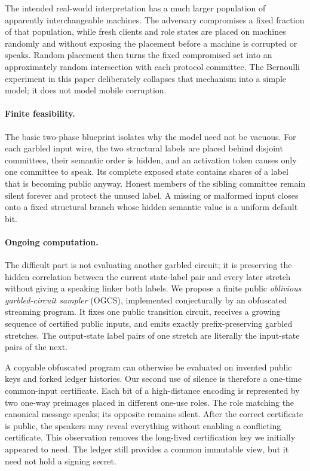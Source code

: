 The intended real-world interpretation has a much larger population of
apparently interchangeable machines. The adversary compromises a fixed
fraction of that population, while fresh clients and role states are placed
on machines randomly and without exposing the placement before a machine is
corrupted or speaks. Random placement then turns the fixed compromised set
into an approximately random intersection with each protocol committee. The
Bernoulli experiment in this paper deliberately collapses that mechanism into
a simple model; it does not model mobile corruption.

\paragraph{Finite feasibility.}
The basic two-phase blueprint isolates why the model need not be vacuous. For
each garbled input wire, the two structural labels are placed behind disjoint
committees, their semantic order is hidden, and an activation token causes
only one committee to speak. Its complete exposed state contains shares of a
label that is becoming public anyway. Honest members of the sibling committee
remain silent forever and protect the unused label. A missing or malformed
input closes onto a fixed structural branch whose hidden semantic value is a
uniform default bit.

\paragraph{Ongoing computation.}
The difficult part is not evaluating another garbled circuit; it is preserving
the hidden correlation between the current state-label pair and every later
stretch without giving a speaking linker both labels. We propose a finite
public \emph{oblivious garbled-circuit sampler} (OGCS), implemented
conjecturally by an obfuscated streaming program. It fixes one public
transition circuit, receives a growing sequence of certified public inputs,
and emits exactly prefix-preserving garbled stretches. The output-state label
pairs of one stretch are literally the input-state pairs of the next.

A copyable obfuscated program can otherwise be evaluated on invented public
keys and forked ledger histories. Our second use of silence is therefore a
one-time common-input certificate. Each bit of a high-distance encoding is
represented by two one-way preimages placed in different one-use roles. The
role matching the canonical message speaks; its opposite remains silent.
After the correct certificate is public, the speakers may reveal everything
without enabling a conflicting certificate. This observation removes the
long-lived certification key we initially appeared to need. The ledger still
provides a common immutable view, but it need not hold a signing secret.

